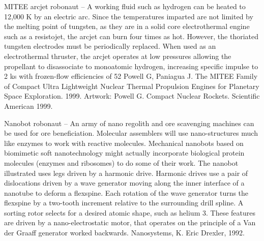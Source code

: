 \documentclass[a4paper]{book}
\begin{document}
MITEE arcjet robonaut – A working fluid such as hydrogen can be heated to 12,000 K by an electric arc. Since the temperatures imparted are not limited by the melting point of tungsten, as they are in a solid core electrothermal engine such as a resistojet, the arcjet can burn four times as hot. However, the thoriated tungsten electrodes must be periodically replaced.  When used as an electrothermal thruster, the arcjet operates at low pressures allowing the propellant to disassociate to monoatomic hydrogen, increasing specific impulse to 2 ks with frozen-flow efficiencies of 52%
Powell G, Paniagua J. The MITEE Family of Compact Ultra Lightweight Nuclear Thermal Propulsion Engines for Planetary Space Exploration. 1999.
Artwork: Powell G. Compact Nuclear Rockets. Scientific American 1999.
 
Nanobot robonaut – An army of nano regolith and ore scavenging machines can be used for ore beneficiation. Molecular assemblers will use nano-structures much like enzymes to work with reactive molecules.  Mechanical nanobots based on biomimetic soft nanotechnology might actually incorporate biological protein molecules (enzymes and ribosomes) to do some of their work.  The nanobot illustrated uses legs driven by a harmonic drive. Harmonic drives use a pair of dislocations driven by a wave generator moving along the inner interface of a nanotube to deform a flexspine.  Each rotation of the wave generator turns the flexspine by a two-tooth increment relative to the surrounding drill spline.  A sorting rotor selects for a desired atomic shape, such as helium 3.  These features are driven by a nano-electrostatic motor, that operates on the principle of a Van der Graaff generator worked backwards. Nanosystems, K. Eric Drexler, 1992.
 
\end{document}
